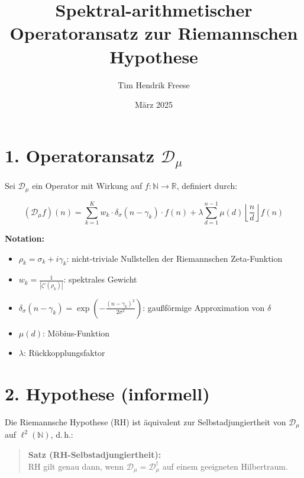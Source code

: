 \documentclass[12pt]{article}
\title{Spektral-arithmetischer Operatoransatz zur Riemannschen Hypothese}
\author{Tim Hendrik Freese}
\date{März 2025}
\begin{document}
\maketitle

\section*{1. Operatoransatz \boldmath$\mathcal{D}_\mu$}

Sei \(\mathcal{D}_\mu\) ein Operator mit Wirkung auf \(f : \mathbb{N} \to \mathbb{R}\), definiert durch:

\begin{equation}
(\mathcal{D}_\mu f)(n) = \sum_{k=1}^{K} w_k \cdot \delta_\sigma(n - \gamma_k) \cdot f(n) + \lambda \sum_{d=1}^{n-1} \mu(d) \left\lfloor \frac{n}{d} \right\rfloor f(n)
\end{equation}

\textbf{Notation:}
\begin{itemize}
  \item \(\rho_k = \sigma_k + i \gamma_k\): nicht-triviale Nullstellen der Riemannschen Zeta-Funktion
  \item \(w_k = \frac{1}{|\zeta'(\rho_k)|}\): spektrales Gewicht
  \item \(\delta_\sigma(n - \gamma_k) = \exp\left( -\frac{(n - \gamma_k)^2}{2 \sigma^2} \right)\): gaußförmige Approximation von \(\delta\)
  \item \(\mu(d)\): Möbius-Funktion
  \item \(\lambda\): Rückkopplungsfaktor
\end{itemize}

\vspace{1em}

\section*{2. Hypothese (informell)}

Die Riemannsche Hypothese (RH) ist äquivalent zur Selbstadjungiertheit von \(\mathcal{D}_\mu\) auf \(\ell^2(\mathbb{N})\), d.\,h.:

\begin{quote}
\textbf{Satz (RH-Selbstadjungiertheit):} \\
RH gilt genau dann, wenn \(\mathcal{D}_\mu = \mathcal{D}_\mu^\dagger\) auf einem geeigneten Hilbertraum.
\end{quote}

\vspace{1em}
\end{document}
